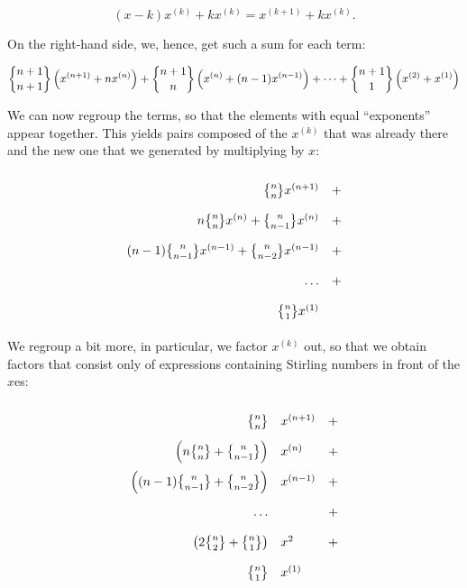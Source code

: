 \documentclass[tikz]{scrreprt}
\begin{document}
\[
(x-k)x^{(k)} + kx^{(k)} = x^{(k+1)} + kx^{(k)}.
\]

On the right-hand side, we, hence, get such a sum for each term:

\[
\stirlingTwo{n+1}{n+1}\left(x^{(n+1)} + nx^{(n)}\right) + 
\stirlingTwo{n+1}{n}\left(x^{(n)} + (n-1)x^{(n-1)}\right) + \dots + 
\stirlingTwo{n+1}{1}\left(x^{(2)} + x^{(1)}\right)
\]

We can now regroup the terms, so that the elements with equal
``exponents'' appear together. This yields pairs composed
of the $x^{(k)}$ that was already there and the new one
that we generated by multiplying by $x$:

\[
\begingroup
\renewcommand{\arraystretch}{2}
\begin{array}{rc}
\stirlingTwo{n}{n}x^{(n+1)} & + \\
n\stirlingTwo{n}{n}x^{(n)}  + 
\stirlingTwo{n}{n-1}x^{(n)} & + \\
(n-1)\stirlingTwo{n}{n-1}x^{(n-1)} + 
\stirlingTwo{n}{n-2}x^{(n-1)} & + \\
\dots & + \\
\stirlingTwo{n}{1}x^{(1)} &
\end{array}
\endgroup
\]


We regroup a bit more, in particular, we
factor $x^{(k)}$ out, so that we obtain
factors that consist only of expressions containing
Stirling numbers in front of the $x$es:

\[
\begingroup
\renewcommand{\arraystretch}{2}
\begin{array}{rlc}
\stirlingTwo{n}{n} & x^{(n+1)} & + \\
\left(n\stirlingTwo{n}{n} + \stirlingTwo{n}{n-1}\right) & x^{(n)} & + \\
\left((n-1)\stirlingTwo{n}{n-1} + \stirlingTwo{n}{n-2}\right) & x^{(n-1)} & + \\ 
\dots & & + \\
\left(2\stirlingTwo{n}{2} + \stirlingTwo{n}{1}\right) & x^{2} & + \\ 
\stirlingTwo{n}{1} & x^{(1)} &
\end{array}
\endgroup
\]
\end{document}
